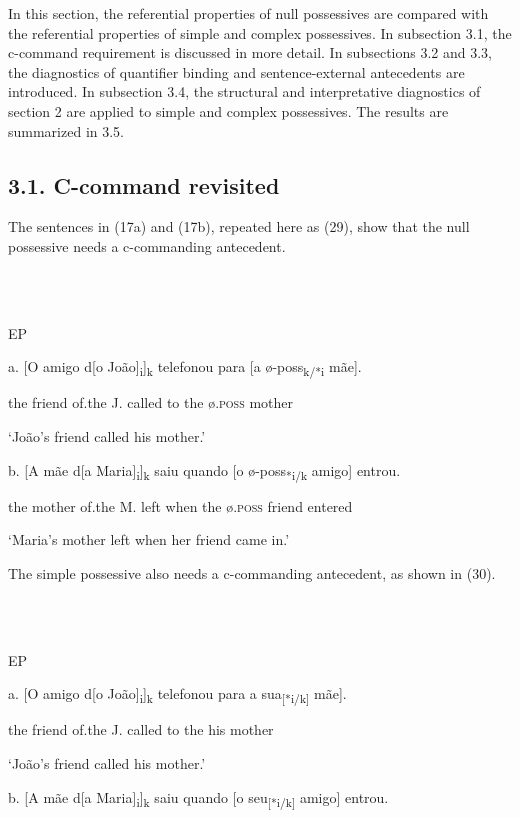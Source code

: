 \documentclass[output=paper]{langsci/langscibook}
\begin{document}
In this section, the referential properties of null possessives are compared with the referential properties of simple and complex possessives. In subsection 3.1, the c-command requirement is discussed in more detail. In subsections 3.2 and 3.3, the diagnostics of quantifier binding and sentence-external antecedents are introduced. In subsection 3.4, the structural and interpretative diagnostics of section 2 are applied to simple and complex possessives. The results are summarized in 3.5.

\subsection{ 3.1. C-command revisited}

The sentences in (17a) and (17b), repeated here as (29), show that the null possessive needs a c-commanding antecedent.

\ea%
    \label{ex:key:29}
    \gll\\
        \\
    \glt
    \z

          EP

  a.  [O amigo d[o João]\textsubscript{i}]\textsubscript{k} telefonou para [a ø-poss\textsubscript{k/*i} mãe].

the friend of.the J. called   to the ø\textsc{.poss} mother

‘João’s friend called his mother.’

  b.  [A mãe d[a Maria]\textsubscript{i}]\textsubscript{k} saiu quando [o ø-poss\textsubscript{*i/k} amigo] entrou.

the mother of.the M. left when the ø\textsc{.poss} friend entered

‘Maria’s mother left when her friend came in.’

The simple possessive also needs a c-commanding antecedent, as shown in (30).

\ea%
    \label{ex:key:30}
    \gll\\
        \\
    \glt
    \z

          EP

  a.  [O amigo d[o João]\textsubscript{i}]\textsubscript{k} telefonou para a   sua\textsubscript{[*i/k]} mãe].

the friend of.the J. called   to the his mother

‘João’s friend called his mother.’

  b.  [A mãe d[a Maria]\textsubscript{i}]\textsubscript{k} saiu quando [o seu\textsubscript{[*i/k]} amigo] entrou.
\end{document}
